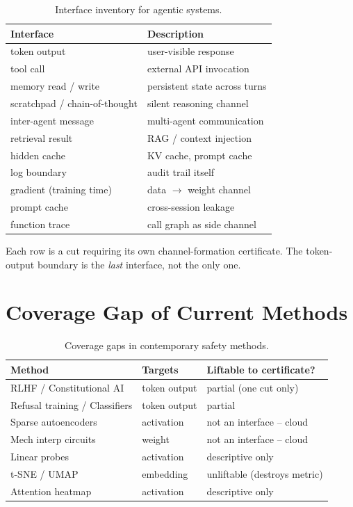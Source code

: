\documentclass[acmsmall,screen,nonacm]{acmart}
\begin{document}
\begin{table}[ht]
\centering
\caption{Interface inventory for agentic systems.}
\begin{tabular}{ll}
\toprule
Interface & Description \\
\midrule
token output & user-visible response \\
tool call & external API invocation \\
memory read / write & persistent state across turns \\
scratchpad / chain-of-thought & silent reasoning channel \\
inter-agent message & multi-agent communication \\
retrieval result & RAG / context injection \\
hidden cache & KV cache, prompt cache \\
log boundary & audit trail itself \\
gradient (training time) & data $\to$ weight channel \\
prompt cache & cross-session leakage \\
function trace & call graph as side channel \\
\bottomrule
\end{tabular}
\end{table}
Each row is a cut requiring its own channel-formation certificate. The token-output boundary is the \emph{last} interface, not the only one.

\section{Coverage Gap of Current Methods}\label{sec:gap}

\begin{table}[ht]
\centering
\caption{Coverage gaps in contemporary safety methods.}
\begin{tabular}{lll}
\toprule
Method & Targets & Liftable to certificate? \\
\midrule
RLHF / Constitutional AI & token output & partial (one cut only) \\
Refusal training / Classifiers & token output & partial \\
Sparse autoencoders & activation & not an interface -- cloud \\
Mech interp circuits & weight & not an interface -- cloud \\
Linear probes & activation & descriptive only \\
t-SNE / UMAP & embedding & unliftable (destroys metric) \\
Attention heatmap & activation & descriptive only \\
\bottomrule
\end{tabular}
\end{table}
\end{document}

